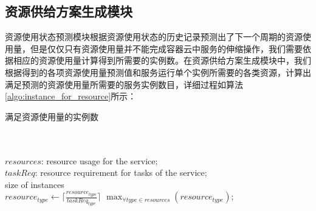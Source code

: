 \subsection{资源供给方案生成模块}\label{sec:provision_active}
资源使用状态预测模块根据资源使用状态的历史记录预测出了下一个周期的资源使用量，但是仅仅只有资源使用量并不能完成容器云中服务的伸缩操作，我们需要依据相应的资源使用量计算得到所需要的实例数。在资源供给方案生成模块中，我们根据得到的各项资源使用量预测值和服务运行单个实例所需要的各类资源，计算出满足预测的资源使用量所需要的服务实例数目，详细过程如算法\ref{algo:instance_for_resource}所示：
\begin{algorithm}[h]
\caption{满足资源使用量的实例数}
\label{algo:instance_for_resource}
\begin{algorithmic}[0]
\\
\Require ~~\
\\
$resources$: resource usage for the service;\\
$taskReq$: resource requirement for tasks of the service;
\Ensure ~~\
\\
size of instances \\

        \State $resource_{type} \gets  \lceil \frac{resource_{type}}{taskReq_{type}} \rceil$
    \EndFor
    \State \Return $\max_{\forall type \in resources} {(resource_{type})}$;
\EndFunction
\end{algorithmic}
\end{algorithm}

